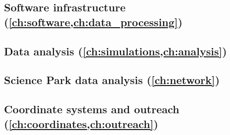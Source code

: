 \subsection{Software infrastructure
            (\cref{ch:software,ch:data_processing})}



\subsection{Data analysis
            (\cref{ch:simulations,ch:analysis})}



\subsection{Science Park data analysis
            (\cref{ch:network})}



\subsection{Coordinate systems and outreach 
            (\cref{ch:coordinates,ch:outreach})}


















